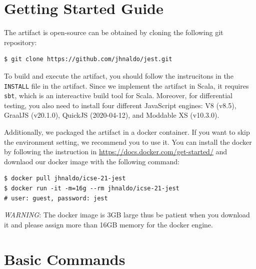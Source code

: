 \documentclass{article}
\begin{document}
\section{Getting Started Guide}

The artifact is open-source can be obtained by cloning the following git
repository:
\begin{lstlisting}
$ git clone https://github.com/jhnaldo/jest.git
\end{lstlisting}
To build and execute the artifact, you should follow the instrucitons in the
\texttt{INSTALL} file in the artifact.  Since we implement the artifact in
Scala, it requires \texttt{sbt}, which is an intereactive build tool for Scala.
Moreover, for differential testing, you also need to install four different
JavaScript engines: V8 (v8.5), GraalJS (v20.1.0), QuickJS (2020-04-12), and
Moddable XS (v10.3.0).

Additionally, we packaged the artifact in a docker container.  If you want to
skip the environment setting, we recommend you to use it.  You can install the
docker by following the instruction in
\url{https://docs.docker.com/get-started/} and downlaod our docker image with
the following command:
\begin{lstlisting}
$ docker pull jhnaldo/icse-21-jest
$ docker run -it -m=16g --rm jhnaldo/icse-21-jest
# user: guest, password: jest
\end{lstlisting}
\textit{WARNING}: The docker image is 3GB large thus be patient when you
download it and please assign more than 16GB memory for the docker engine.


\section{Basic Commands}
\end{document}
